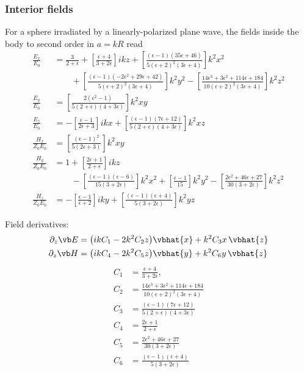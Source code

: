 \documentclass[letterpaper]{article}
\begin{document}
\subsubsection*{Interior fields }

For a sphere irradiated by a linearly-polarized plane wave,
the fields inside the body to second order in $a=kR$ read
\begin{align*}
 \frac{E_x}{E_0} &= \frac{3}{2+\epsilon} 
        +\left[\frac{\epsilon+4}{3+2\epsilon}\right] ikz
  +\left[\frac{(\epsilon-1)(35\epsilon+46)}
              {5(\epsilon+2)^2 (3 \epsilon+4)}
   \right]k^2 x^2
\\[5pt]
&\qquad
  +\left[\frac{(\epsilon-1)(-2\epsilon^2+29\epsilon+42)}
              {5(\epsilon+2)^2 (3 \epsilon+4)}
   \right]k^2 y^2
  -\left[\frac{14\epsilon^3 + 3\epsilon^2 + 114\epsilon + 184}
              {10(\epsilon+2)^2 (3 \epsilon+4)}
   \right]k^2 z^2
\\[5pt]
 \frac{E_y}{E_0} 
 &= \left[\frac{2(\epsilon^2-1)}{5(2+\epsilon)(4+3\epsilon)}\right] k^2 xy
\\
 \frac{E_z}{E_0} &= -\left[\frac{\epsilon-1}{2\epsilon+3}\right] ikx
        +\left[\frac{(\epsilon-1)(7\epsilon+12)}
                    {5(2+\epsilon)(4+3\epsilon)}
        \right]k^2 xz
\\[5pt]
 \frac{H_x}{Z_0 E_0} 
 &= \left[\frac{(\epsilon-1)^2}{5(2\epsilon+3)}\right] k^2 xy
\\[5pt]
 \frac{H_y}{Z_0 E_0} 
  &= 1 + \left[\frac{2\epsilon+1}{2+\epsilon}\right] ikz
\\[5pt]
&\qquad - \left[\frac{(\epsilon-1)(\epsilon-6)}{15(3+2\epsilon)}\right]k^2 x^2
        + \left[\frac{\epsilon-1}{15}\right]k^2 y^2 
        - \left[\frac{2\epsilon^2 + 46\epsilon + 27}{30(3+2\epsilon)}
          \right]k^2 z^2
\\
 \frac{H_z}{Z_0 E_0} 
     &= -\left[\frac{\epsilon-1}{\epsilon+2}\right] iky
        +\left[\frac{(\epsilon-1)(\epsilon+4)}
                    {5(3+2\epsilon)}\right] k^2 yz
\end{align*}

Field derivatives:
\begin{align*}
 \partial_z \vb E &= \big(ikC_1 - 2k^2 C_2 z\big)\vbhat{x} 
                     +k^2 C_3 x\,\vbhat{z}
\\
 \partial_z \vb H &= \big(ik C_4 - 2k^2 C_5 z\big) \vbhat{y}
                     +k^2 C_6 y\,\vbhat{z}
\end{align*}
\begin{align*}
 C_1 &= \frac{\epsilon+4}{3+2\epsilon},
\\
 C_2 &= \frac{14\epsilon^3 + 3\epsilon^2 + 114\epsilon + 184}
             {10(\epsilon+2)^2 (3 \epsilon+4)}
\\
 C_3 &= \frac{(\epsilon-1)(7\epsilon+12)}{5(2+\epsilon)(4+3\epsilon)}
\\
C_4 &= \frac{2\epsilon+1}{2+\epsilon}
\\
C_5 &= \frac{2\epsilon^2 + 46\epsilon + 27}{30(3+2\epsilon)}
\\
C_6 &= \frac{(\epsilon-1)(\epsilon+4)} {5(3+2\epsilon)}
\end{align*}
\end{document}
